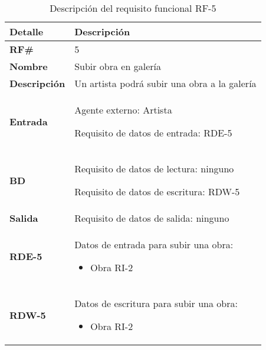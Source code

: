 \begin{table}[H]
    \centering
    \begin{tabular}{|p{3cm}|p{8cm}|}
        \hline
        \rowcolor{lightgray}
        \textbf{Detalle} & \textbf{Descripción} \\
        \hline
        \textbf{RF\#} & 5 \\
        \hline
        \textbf{Nombre} & Subir obra en galería \\
        \hline
        \textbf{Descripción} & Un artista podrá subir una obra a la galería \\
        \hline
        \textbf{Entrada} &
        Agente externo: Artista
        
        Requisito de datos de entrada: RDE-5 \\
        \hline
        \textbf{BD} &
        Requisito de datos de lectura: ninguno
        
        Requisito de datos de escritura: RDW-5 \\
        \hline
        \textbf{Salida} & Requisito de datos de salida: ninguno \\
        \hline
        \textbf{RDE-5} & Datos de entrada para subir una obra:
            \begin{itemize}
                \item Obra RI-2
            \end{itemize} \\
        \hline
        \textbf{RDW-5} & Datos de escritura para subir una obra:
            \begin{itemize}
                \item Obra RI-2
            \end{itemize} \\
        \hline
    \end{tabular}
    \caption{Descripción del requisito funcional RF-5}
    \label{tab:rf-5}
\end{table}

